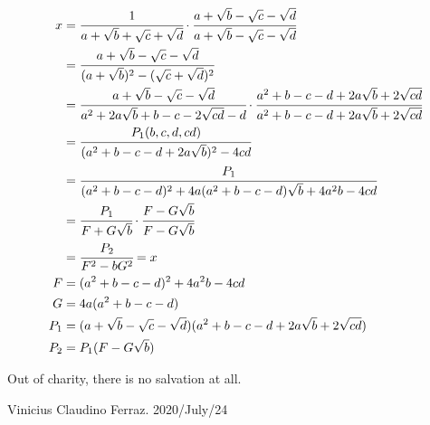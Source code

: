 \documentclass[12pt]{article}
\begin{document}
\begin{align}
  x &= \cfrac{1}{a + \sqrt{b} + \sqrt{c} + \sqrt{d}} \cdot \cfrac{a + \sqrt{b} - \sqrt{c} - \sqrt{d}}{a + \sqrt{b} - \sqrt{c} - \sqrt{d}} \\
    &= \cfrac{a + \sqrt{b} - \sqrt{c} - \sqrt{d}}{(a + \sqrt{b})^2 - (\sqrt{c} + \sqrt{d})^2} \\
    &= \cfrac{a + \sqrt{b} - \sqrt{c} - \sqrt{d}}{a^2 + 2a\sqrt{b} + b - c - 2\sqrt{cd} - d} \cdot \cfrac{a^2 + b - c - d + 2a\sqrt{b} + 2\sqrt{cd}}{a^2 + b - c - d + 2a\sqrt{b} + 2\sqrt{cd}} \\
    &= \cfrac{P_1(b, c, d, cd)}{(a^2 + b - c - d + 2a\sqrt{b})^2 - 4cd} \\
    &= \cfrac{P_1}{(a^2 + b - c - d)^2 + 4a(a^2 + b - c - d)\sqrt{b} + 4a^2 b - 4cd} \\
    &= \cfrac{P_1}{F + G\sqrt{b}} \cdot \cfrac{F - G\sqrt{b}}{F - G\sqrt{b}} \\
    &= \cfrac{P_2}{F^2 - bG^2} = x \\
  F &= (a^2 + b - c - d)^2 + 4a^2 b - 4cd \\
  G &= 4a(a^2 + b - c - d) \\
  P_1 &= (a + \sqrt{b} - \sqrt{c} - \sqrt{d})(a^2 + b - c - d + 2a\sqrt{b} + 2\sqrt{cd}) \\
  P_2 &= P_1 (F - G\sqrt{b})
\end{align}

\vspace{6mm}

Out of charity, there is no salvation at all.

Vinicius Claudino Ferraz. 2020/July/24
\end{document}
